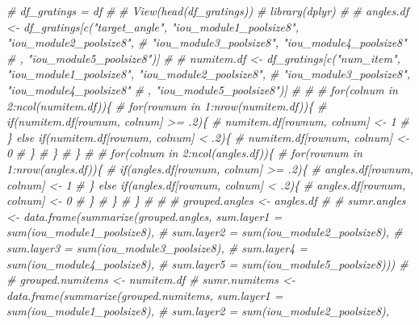 \documentclass[]{article}
\newenvironment{Shaded}{\begin{snugshade}}{\end{snugshade}}
\newcommand{\CommentTok}[1]{\textcolor[rgb]{0.56,0.35,0.01}{\textit{#1}}}
\begin{document}
\begin{Shaded}
\begin{Highlighting}[]
\CommentTok{# df_gratings = df}
\CommentTok{# }
\CommentTok{# View(head(df_gratings))}
\CommentTok{# library(dplyr)}
\CommentTok{#                                           }
\CommentTok{# angles.df <- df_gratings[c("target_angle", "iou_module1_poolsize8", "iou_module2_poolsize8", }
\CommentTok{#                            "iou_module3_poolsize8", "iou_module4_poolsize8"}
\CommentTok{#                            , "iou_module5_poolsize8")]}
\CommentTok{# }
\CommentTok{# numitem.df <-  df_gratings[c("num_item", "iou_module1_poolsize8", "iou_module2_poolsize8", }
\CommentTok{#                              "iou_module3_poolsize8", "iou_module4_poolsize8"}
\CommentTok{#                              , "iou_module5_poolsize8")]}
\CommentTok{# }
\CommentTok{# }
\CommentTok{# for(colnum in 2:ncol(numitem.df))\{}
\CommentTok{#   for(rownum in 1:nrow(numitem.df))\{}
\CommentTok{#     if(numitem.df[rownum, colnum] >= .2)\{}
\CommentTok{#       numitem.df[rownum, colnum] <- 1}
\CommentTok{#     \} else if(numitem.df[rownum, colnum] < .2)\{}
\CommentTok{#       numitem.df[rownum, colnum] <- 0 }
\CommentTok{#     \}}
\CommentTok{#   \}}
\CommentTok{# \}}
\CommentTok{# }
\CommentTok{# for(colnum in 2:ncol(angles.df))\{}
\CommentTok{#   for(rownum in 1:nrow(angles.df))\{}
\CommentTok{#     if(angles.df[rownum, colnum] >= .2)\{}
\CommentTok{#       angles.df[rownum, colnum] <- 1}
\CommentTok{#     \} else if(angles.df[rownum, colnum] < .2)\{}
\CommentTok{#       angles.df[rownum, colnum] <- 0 }
\CommentTok{#     \}}
\CommentTok{#   \}}
\CommentTok{# \}}
\CommentTok{# }
\CommentTok{# }
\CommentTok{# grouped.angles <- angles.df %>% group_by(target_angle)}
\CommentTok{# }
\CommentTok{# sumr.angles <- data.frame(summarize(grouped.angles, sum.layer1 = sum(iou_module1_poolsize8), }
\CommentTok{#                                                    sum.layer2 = sum(iou_module2_poolsize8),}
\CommentTok{#                                                    sum.layer3 = sum(iou_module3_poolsize8),}
\CommentTok{#                                                    sum.layer4 = sum(iou_module4_poolsize8),}
\CommentTok{#                                                    sum.layer5 = sum(iou_module5_poolsize8)))}
\CommentTok{# }
\CommentTok{# grouped.numitems <- numitem.df %>% group_by(num_item)}
\CommentTok{# sumr.numitems <- data.frame(summarize(grouped.numitems, sum.layer1 = sum(iou_module1_poolsize8), }
\CommentTok{#                                                    sum.layer2 = sum(iou_module2_poolsize8),}
}}
\end{Highlighting}
\end{Shaded}
\end{document}
